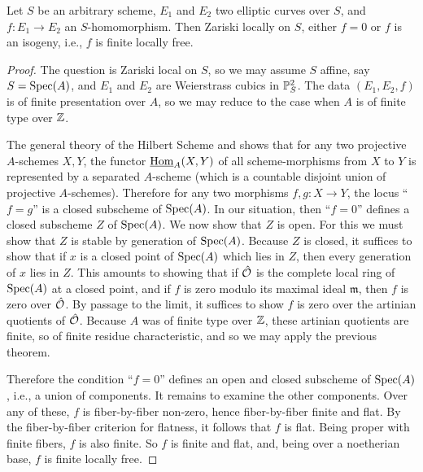 \begin{theorem}\label{thm:2.4.2}
Let $S$ be an arbitrary scheme, $E_1$ and $E_2$ two elliptic curves over $S$, and $f : E_1 \to E_2$ an $S$-homomorphism. Then Zariski locally on $S$, either $f = 0$ or $f$ is an isogeny, i.e., $f$ is finite locally free.
\end{theorem}

\begin{proof}
The question is Zariski local on $S$, so we may assume $S$ affine, say $S = \operatorname{Spec}(A)$, and $E_1$ and $E_2$ are Weierstrass cubics in $\mathbb{P}^2_S$. The data $(E_1, E_2, f)$ is of finite presentation over $A$, so we may reduce to the case when $A$ is of finite type over $\mathbb{Z}$.

The general theory of the Hilbert Scheme \cite[p.~22]{Mum3} and \cite[2.8]{AK2} shows that for any two projective $A$-schemes $X, Y$, the functor $\underline{\operatorname{Hom}}_A(X, Y)$ of all scheme-morphisms from $X$ to $Y$ is represented by a separated $A$-scheme (which is a countable disjoint union of projective $A$-schemes). Therefore for any two morphisms $f, g : X \to Y$, the locus ``$f = g$'' is a closed subscheme of $\operatorname{Spec}(A)$. In our situation, then ``$f = 0$'' defines a closed subscheme $Z$ of $\operatorname{Spec}(A)$. We now show that $Z$ is open. For this we must show that $Z$ is stable by generation of $\operatorname{Spec}(A)$. Because $Z$ is closed, it suffices to show that if $x$ is a closed point of $\operatorname{Spec}(A)$ which lies in $Z$, then every generation of $x$ lies in $Z$. This amounts to showing that if $\hat{\mathcal{O}}$ is the complete local ring of $\operatorname{Spec}(A)$ at a closed point, and if $f$ is zero modulo its maximal ideal $\mathfrak{m}$, then $f$ is zero over $\hat{\mathcal{O}}$. By passage to the limit, it suffices to show $f$ is zero over the artinian quotients of $\hat{\mathcal{O}}$. Because $A$ was of finite type over $\mathbb{Z}$, these artinian quotients are finite, so of finite residue characteristic, and so we may apply the previous theorem.

Therefore the condition ``$f = 0$'' defines an open and closed subscheme of $\operatorname{Spec}(A)$, i.e., a union of components. It remains to examine the other components. Over any of these, $f$ is fiber-by-fiber non-zero, hence fiber-by-fiber finite and flat. By the fiber-by-fiber criterion for flatness, it follows that $f$ is flat. Being proper with finite fibers, $f$ is also finite. So $f$ is finite and flat, and, being over a noetherian base, $f$ is finite locally free.
\end{proof}

